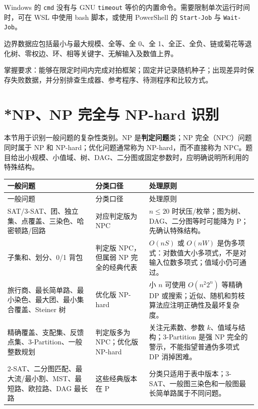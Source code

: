 \documentclass[a4paper,11pt]{article}
\newcommand{\code}[1]{\texttt{#1}}
\begin{document}
Windows 的 \code{cmd} 没有与 GNU \code{timeout} 等价的内置命令。需要限制单次运行时间时，可在 WSL 中使用 bash 脚本，或使用 PowerShell 的 \code{Start-Job} 与 \code{Wait-Job}。

边界数据应包括最小与最大规模、全等、全 0、全 1、全正、全负、链或菊花等退化树、零权边、环、相等关键字、无解输入及数值上界。

掌握要求：能够在限定时间内完成对拍框架；固定并记录随机种子；出现差异时保存失败数据，并分别排查生成器、参考程序、待测程序和比较方式。

\newpage
\section{*NP、NP 完全与 NP-hard 识别}

本节用于识别一般问题的复杂性类别。NP 是\textbf{判定问题}类；NP 完全（NPC）问题同时属于 NP 和 NP-hard；优化问题通常称为 NP-hard，而不直接称为 NPC。题目给出小规模、小值域、树、DAG、二分图或固定参数时，应明确说明所利用的特殊结构。

\begin{longtable}{L{5.0cm} L{4.0cm} L{7.0cm}}
\toprule
一般问题 & 分类口径 & 处理原则 \\
\midrule
\endfirsthead
\toprule
一般问题 & 分类口径 & 处理原则 \\
\midrule
\endhead
\endfoot
\bottomrule
\endlastfoot
SAT/3-SAT、团、独立集、点覆盖、三染色、哈密顿路/回路 & 对应判定版为 NPC & $n\le20$ 时状压/枚举；图为树、DAG、二分图等时可能降为 P；先确认特殊结构。\\[2mm]
子集和、划分、0/1 背包 & 判定版 NPC，但属弱 NP 完全的经典代表 & $O(nS)$ 或 $O(nW)$ 是伪多项式：对数值大小多项式，不是对输入位数多项式；值域小仍可通过。\\[2mm]
旅行商、最长简单路、最小染色、最大团、最小集合覆盖、Steiner 树 & 优化版 NP-hard & 小 $n$ 可使用 $O(n^2 2^n)$ 等精确 DP 或搜索；近似、随机和剪枝算法应注明正确性及最坏复杂度。\\[2mm]
精确覆盖、支配集、反馈点集、3-Partition、一般整数规划 & 判定版多为 NPC；优化版 NP-hard & 关注元素数、参数 $k$、值域与结构；3-Partition 是强 NP 完全的警示，不能指望普通伪多项式 DP 消掉困难。\\[2mm]
2-SAT、二分图匹配、最大流/最小割、MST、最短路、欧拉路、DAG 最长路 & 这些经典版本在 P & 分类只适用于表中版本；3-SAT、一般图三染色和一般图最长简单路属于不同问题。\\
\end{longtable}
\end{document}
